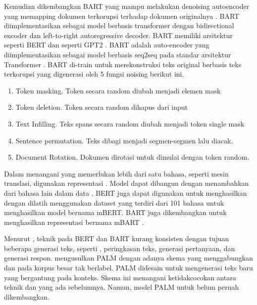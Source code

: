 Kemudian dikembangkan \gls{BART} yang mampu melakukan denoising autoencoder yang memapping dokumen terkorupsi terhadap dokumen originalnya .
\gls{BART} diimplementasikan sebagai model berbasis transformer dengan bidirectional encoder dan left-to-right autoregressive decoder.
\gls{BART} memiliki arsitektur  seperti \gls{BERT}  dan  seperti \gls{GPT2} .
\gls{BART}  adalah auto-encoder yang diimplementasikan sebagai model berbasis \gls{seq2seq} pada standar arsitektur Transformer .
\gls{BART} di-train untuk merekonstruksi teks original berbasis teks terkorupsi yang digenerasi oleh 5 fungsi noising berikut ini.
\begin{enumerate}
  \item Token masking.
  Token secara random diubah menjadi elemen mask
  \item Token deletion.
  Token secara random dihapus dari input
  \item Text Infilling.
  Teks spans secara random diubah menjadi token single mask
  \item Sentence permutation.
  Teks dibagi menjadi segmen-segmen lalu diacak.
  \item Document Rotation.
  Dokumen dirotasi untuk dimulai dengan token random.
\end{enumerate}


Dalam menangani  yang memerlukan lebih dari satu bahasa, seperti mesin translasi, digunakan representasi \mwordem{}.
Model \multil{} dapat dibangun dengan menambahkan  dari bahasa lain dalam data .
\gls{BERT} juga dapat digunakan untuk menghasilkan \mwordem{} dengan dilatih menggunakan dataset yang terdiri dari 101 bahasa untuk menghasilkan \multil{} model bernama mBERT.
\gls{BART} juga dikembangkan untuk menghasilkan representasi \mwordem{} bernama mBART .

Menurut \textcite{bi2020}, teknik \pretraining{} pada \gls{BERT} dan \gls{BART} kurang konsisten dengan tujuan beberapa  generasi teks, seperti , peringkasan teks, generasi pertanyaan, dan generasi respon.
\textcite{bi2020} mengusulkan \gls{PALM} dengan adanya skema yang menggabungkan \pretraining{}  dan   pada korpus besar tak berlabel.
\gls{PALM} didesain untuk mengenerasi teks baru yang bergantung pada konteks.
Skema ini menangani ketidakcocokan antara teknik \pretraining{} dan \finetuning{} yang ada sebelumnya.
Namun, model \gls{PALM} untuk \mwordem{} belum pernah dikembangkan.
